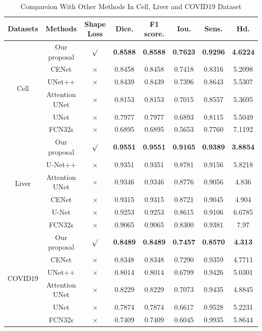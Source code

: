 \documentclass{ieeeaccess}
\begin{document}
\begin{table}[htbp]
\begin{center}
\begin{tabular}{cccccccc}
    \toprule
    Datasets & Methods & Shape Loss & Dice. & F1 score. & Iou. & Sens. & Hd.\\
    \midrule
    \multirow{6}{*}{Cell} & Our proposal & $\surd$ & \textbf{0.8588} & \textbf{0.8588} & \textbf{0.7623} & \textbf{0.9296} & \textbf{4.6224}\\
                          & CENet & $\times$ & 0.8458 & 0.8458 & 0.7418 & 0.8316 & 5.2098\\
                          & UNet++ & $\times$ & 0.8439 & 0.8439 & 0.7396 & 0.8643 & 5.5307\\
                          & Attention UNet & $\times$ & 0.8153 & 0.8153 & 0.7015 & 0.8557 & 5.3695\\
                          & UNet  & $\times$  & 0.7977 & 0.7977 & 0.6893 & 0.8115 & 5.5049\\
                          & FCN32s & $\times$ & 0.6895 & 0.6895 & 0.5653 & 0.7760 & 7.1192\\
                          \hline
    \multirow{6}{*}{Liver}   & Our proposal & $\surd$ & \textbf{0.9551} & \textbf{0.9551} & \textbf{0.9165} & \textbf{0.9389} & \textbf{3.8854}\\
                          & U-Net++ & $\times$ & 0.9351 & 0.9351 & 0.8781 & 0.9156 & 5.8218\\
                          & Attention UNet & $\times$ & 0.9346 & 0.9346 & 0.8776 & 0.9056 & 4.836\\
                          & CENet & $\times$ & 0.9315 & 0.9315 & 0.8721 & 0.9045 & 4.904\\
                          & U-Net & $\times$ & 0.9253 & 0.9253 & 0.8615 & 0.9106 & 6.6785\\
                          & FCN32s & $\times$ & 0.9065 & 0.9065 & 0.8300 & 0.9381 & 7.97\\
                          \hline
    \multirow{6}{*}{COVID19} &  Our proposal & $\surd$ & \textbf{0.8489} & \textbf{0.8489} & \textbf{0.7457} & \textbf{0.8570} & \textbf{4.313}\\
                          &  CENet & $\times$ & 0.8348 & 0.8348 & 0.7290 & 0.9359 & 4.7711\\
                          &  UNet++ & $\times$ & 0.8014 & 0.8014 & 0.6799 & 0.9426 & 5.0301\\
                          &  Attention UNet & $\times$ & 0.8229 & 0.8229 & 0.7073 & 0.9435 & 4.8845\\
                          &  UNet  & $\times$ & 0.7874 & 0.7874 & 0.6617 & 0.9528 & 5.2231\\
                          &  FCN32s & $\times$ & 0.7409 & 0.7409 & 0.6045 & 0.9935 & 5.8644\\
  \bottomrule    
    \end{tabular}
    \caption{Comparsion With Other Methods In Cell\cite{dsb2018}, Liver\cite{liver} and COVID19\cite{covid19_2} Dataset}
  \end{center}
    \vspace{-4mm}
  \end{table}
\end{document}
